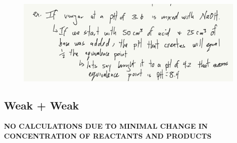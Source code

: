 \documentclass{article}
\begin{document}
\begin{enumerate}
\begin{figure}
\includegraphics[width=\textwidth]{4.6fig4.png}
\end{figure}


\end{enumerate}
\subsection{Weak + Weak}
\textbf{NO CALCULATIONS DUE TO MINIMAL CHANGE IN CONCENTRATION OF REACTANTS AND PRODUCTS}
\end{document}
